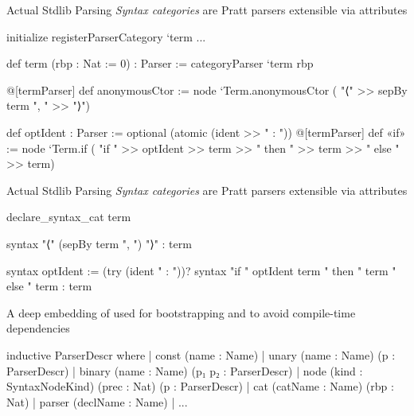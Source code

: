 \documentclass[en,t]{sdqbeamer}
\begin{document}
\begin{frame}[fragile]{Actual Stdlib Parsing}
  \emph{Syntax categories} are Pratt parsers extensible via attributes
\begin{leancode}
initialize registerParserCategory `term ...

def term (rbp : Nat := 0) : Parser :=
  categoryParser `term rbp

@[termParser] def anonymousCtor := node `Term.anonymousCtor (
  "⟨" >> sepBy term ", " >> "⟩")

def optIdent : Parser := optional (atomic (ident >> " : "))
@[termParser] def «if»  := node `Term.if (
  "if " >> optIdent >> term >> " then " >> term >> " else " >> term)
\end{leancode}
\end{frame}

\begin{frame}[fragile]{Actual Stdlib Parsing}
  \emph{Syntax categories} are Pratt parsers extensible via attributes
\begin{leancode}
declare_syntax_cat term

syntax "⟨" (sepBy term ", ") "⟩" : term

syntax optIdent := (try (ident " : "))?
syntax "if " optIdent term " then " term " else " term : term
\end{leancode}
\end{frame}

\begin{frame}[fragile]{}
  A deep embedding of  used for bootstrapping and to avoid compile-time dependencies
\begin{leancode}
inductive ParserDescr where
  | const  (name : Name)
  | unary  (name : Name) (p : ParserDescr)
  | binary (name : Name) (p₁ p₂ : ParserDescr)
  | node (kind : SyntaxNodeKind) (prec : Nat) (p : ParserDescr)
  | cat (catName : Name) (rbp : Nat)
  | parser (declName : Name)
  | ...
\end{leancode}
\end{frame}

%
%
%
%
%
%
\end{document}
